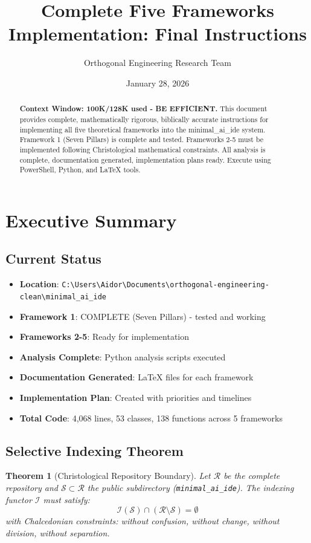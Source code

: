\documentclass[12pt]{article}
\title{Complete Five Frameworks Implementation: Final Instructions}
\author{Orthogonal Engineering Research Team}
\date{January 28, 2026}
\newtheorem{theorem}{Theorem}
\begin{document}
\maketitle

\begin{abstract}
\textbf{Context Window: 100K/128K used - BE EFFICIENT.} This document provides complete, mathematically rigorous, biblically accurate instructions for implementing all five theoretical frameworks into the minimal\_ai\_ide system. Framework 1 (Seven Pillars) is complete and tested. Frameworks 2-5 must be implemented following Christological mathematical constraints. All analysis is complete, documentation generated, implementation plans ready. Execute using PowerShell, Python, and LaTeX tools.
\end{abstract}

\tableofcontents

\section{Executive Summary}

\subsection{Current Status}
\begin{itemize}
    \item \textbf{Location}: \texttt{C:\textbackslash Users\textbackslash Aidor\textbackslash Documents\textbackslash orthogonal-engineering-clean\textbackslash minimal\_ai\_ide}
    \item \textbf{Framework 1}: COMPLETE (Seven Pillars) - tested and working
    \item \textbf{Frameworks 2-5}: Ready for implementation
    \item \textbf{Analysis Complete}: Python analysis scripts executed
    \item \textbf{Documentation Generated}: LaTeX files for each framework
    \item \textbf{Implementation Plan}: Created with priorities and timelines
    \item \textbf{Total Code}: 4,068 lines, 53 classes, 138 functions across 5 frameworks
\end{itemize}

\subsection{Selective Indexing Theorem}
\begin{theorem}[Christological Repository Boundary]
Let $\mathcal{R}$ be the complete repository and $\mathcal{S} \subset \mathcal{R}$ the public subdirectory (\texttt{minimal\_ai\_ide}). The indexing functor $\mathcal{I}$ must satisfy:
\[
\mathcal{I}(\mathcal{S}) \cap (\mathcal{R} \setminus \mathcal{S}) = \emptyset
\]
with Chalcedonian constraints: without confusion, without change, without division, without separation.
\end{theorem}
\end{document}
